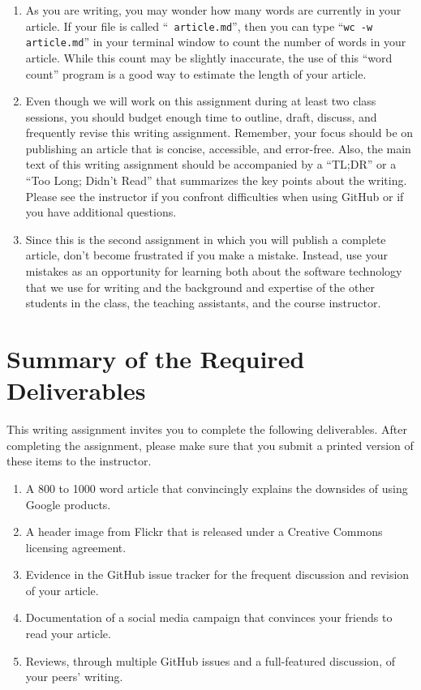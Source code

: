 \begin{enumerate}
  \item As you are writing, you may wonder how many words are currently in your article. If your file is called ``{\tt
    article.md}'', then you can type ``{\tt wc -w article.md}'' in your terminal window to count the number of words in
    your article. While this count may be slightly inaccurate, the use of this ``word count'' program is a good way to
    estimate the length of your article.

  \item Even though we will work on this assignment during at least two class sessions, you should budget enough time to
    outline, draft, discuss, and frequently revise this writing assignment. Remember, your focus should be on publishing
    an article that is concise, accessible, and error-free. Also, the main text of this writing assignment should be
    accompanied by a ``TL;DR'' or a ``Too Long; Didn't Read'' that summarizes the key points about the writing. Please
    see the instructor if you confront difficulties when using GitHub or if you have additional questions.

  \item Since this is the second assignment in which you will publish a complete article, don't become frustrated if you
    make a mistake. Instead, use your mistakes as an opportunity for learning both about the software technology that we
    use for writing and the background and expertise of the other students in the class, the teaching assistants, and
    the course instructor.

\end{enumerate}

\vspace*{-.15in}
\section*{Summary of the Required Deliverables}

This writing assignment invites you to complete the following deliverables. After completing the assignment, please make
sure that you submit a printed version of these items to the instructor.

\vspace*{-.1in}
\begin{enumerate}
  \setlength{\itemsep}{-.01in}

  \item A 800 to 1000 word article that convincingly explains the downsides of using Google products.
  \item A header image from Flickr that is released under a Creative Commons licensing agreement.
  \item Evidence in the GitHub issue tracker for the frequent discussion and revision of your article.
  \item Documentation of a social media campaign that convinces your friends to read your article.
  \item Reviews, through multiple GitHub issues and a full-featured discussion, of your peers' writing.

\end{enumerate}
\vspace*{-.1in}

